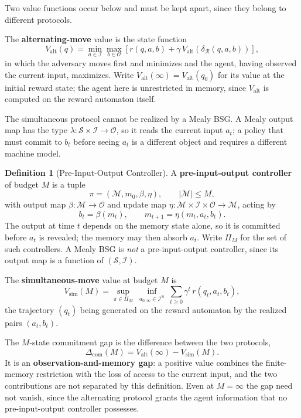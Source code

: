\documentclass[12pt]{article}
\theoremstyle{definition}
\newtheorem{definition}[theorem]{Definition}
\newcommand{\Com}{\Delta_{\mathrm{com}}}
\newcommand{\Valt}{V_{\mathrm{alt}}}
\newcommand{\Vsim}{V_{\mathrm{sim}}}
\begin{document}
Two value functions occur below and must be kept apart, since they belong to
different protocols.

The \textbf{alternating-move} value is the state function
\[
\Valt(q)
=
\min_{a\in\mathcal I}
\max_{b\in\mathcal O}
\left[
r(q,a,b)+\gamma\,\Valt(\delta_{\mathcal R}(q,a,b))
\right],
\]
in which the adversary moves first and minimizes and the agent, having observed
the current input, maximizes.  Write $\Valt(\infty)=\Valt(q_0)$ for its value
at the initial reward state; the agent here is unrestricted in memory, since
$\Valt$ is computed on the reward automaton itself.

The simultaneous protocol cannot be realized by a Mealy BSG.  A Mealy output
map has the type $\lambda:\mathcal S\times\mathcal I\to\mathcal O$, so it reads
the current input $a_t$; a policy that must commit to $b_t$ before seeing
$a_t$ is a different object and requires a different machine model.

\begin{definition}[Pre-Input-Output Controller]
\label{def:pio-controller}
A \textbf{pre-input-output controller} of budget $M$ is a tuple
\[
\pi=(\mathcal M,m_0,\beta,\eta),
\qquad
|\mathcal M|\le M,
\]
with output map $\beta:\mathcal M\to\mathcal O$ and update map
$\eta:\mathcal M\times\mathcal I\times\mathcal O\to\mathcal M$, acting by
\[
b_t=\beta(m_t),
\qquad
m_{t+1}=\eta(m_t,a_t,b_t).
\]
The output at time $t$ depends on the memory state alone, so it is committed
before $a_t$ is revealed; the memory may then absorb $a_t$.  Write $\Pi_M$ for
the set of such controllers.  A Mealy BSG is \emph{not} a pre-input-output
controller, since its output map is a function of $(\mathcal S,\mathcal I)$.
\end{definition}

The \textbf{simultaneous-move} value at budget $M$ is
\[
\Vsim(M)
=
\sup_{\pi\in\Pi_M}
\ \inf_{a_{0:\infty}\in\mathcal I^{\mathbb N}}
\ \sum_{t\ge0}\gamma^t\,r(q_t,a_t,b_t),
\]
the trajectory $(q_t)$ being generated on the reward automaton by the realized
pairs $(a_t,b_t)$.

The $M$-state commitment gap is the difference between the two protocols,
\[
\Com(M)=\Valt(\infty)-\Vsim(M).
\]
It is an \textbf{observation-and-memory gap}: a positive value combines the
finite-memory restriction with the loss of access to the current input, and
the two contributions are not separated by this definition.  Even at
$M=\infty$ the gap need not vanish, since the alternating protocol grants the
agent information that no pre-input-output controller possesses.
\end{document}
